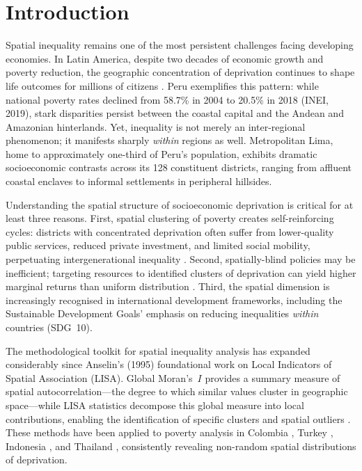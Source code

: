 \documentclass[12pt,a4paper,twoside]{article}
\begin{document}
\section{Introduction}

Spatial inequality remains one of the most persistent challenges facing developing
economies. In Latin America, despite two decades of economic growth and poverty
reduction, the geographic concentration of deprivation continues to shape life
outcomes for millions of citizens \citep{gonzalez2025pobreza}. Peru exemplifies this
pattern: while national poverty rates declined from 58.7\% in 2004 to 20.5\% in 2018
(INEI, 2019), stark disparities persist between the coastal capital and the Andean
and Amazonian hinterlands. Yet, inequality is not merely an inter-regional phenomenon;
it manifests sharply \textit{within} regions as well. Metropolitan Lima, home to
approximately one-third of Peru's population, exhibits dramatic socioeconomic contrasts
across its 128 constituent districts, ranging from affluent coastal enclaves to informal
settlements in peripheral hillsides.

Understanding the spatial structure of socioeconomic deprivation is critical for at
least three reasons. First, spatial clustering of poverty creates self-reinforcing
cycles: districts with concentrated deprivation often suffer from lower-quality public
services, reduced private investment, and limited social mobility, perpetuating
intergenerational inequality \citep{tatli2025subjective}. Second, spatially-blind
policies may be inefficient; targeting resources to identified clusters of deprivation
can yield higher marginal returns than uniform distribution \citep{sandu2025wales}.
Third, the spatial dimension is increasingly recognised in international development
frameworks, including the Sustainable Development Goals' emphasis on reducing
inequalities \textit{within} countries (SDG~10).

The methodological toolkit for spatial inequality analysis has expanded considerably
since Anselin's (1995) foundational work on Local Indicators of Spatial Association
(LISA). Global Moran's~$I$ \citep{moran1950} provides a summary measure of spatial
autocorrelation---the degree to which similar values cluster in geographic space---while
LISA statistics decompose this global measure into local contributions, enabling the
identification of specific clusters and spatial outliers \citep{anselin1995lisa,
chen2022reconstruction}. These methods have been applied to poverty analysis in
Colombia \citep{gonzalez2025pobreza}, Turkey \citep{tatli2025subjective}, Indonesia
\citep{lestari2023bali, oktavilia2026mapping, jati2024grobogan}, and Thailand
\citep{ruamtawee2026tsdi}, consistently revealing non-random spatial distributions
of deprivation.
\end{document}
